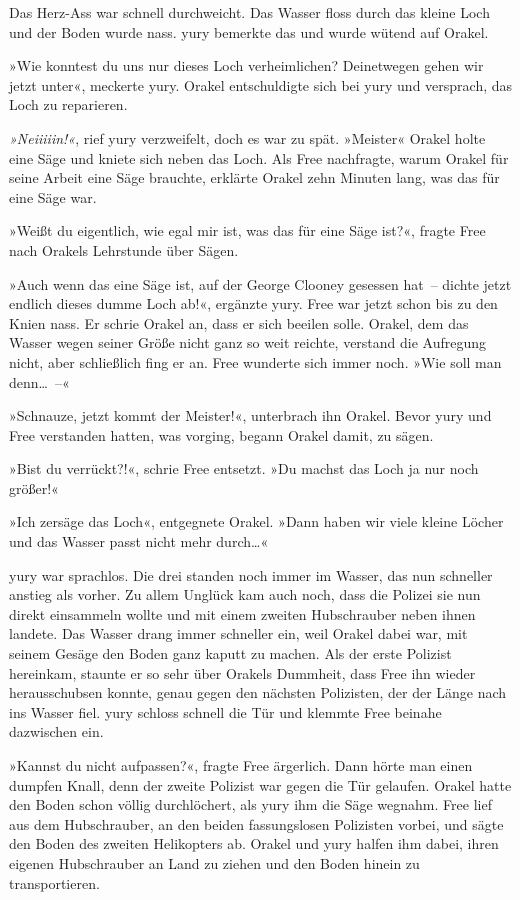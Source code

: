 Das Herz-Ass war schnell durchweicht. Das Wasser floss durch das kleine Loch und der Boden wurde nass. yury bemerkte das und wurde wütend auf Orakel.

»Wie konntest du uns nur dieses Loch verheimlichen? Deinetwegen gehen wir jetzt unter«, meckerte yury. Orakel entschuldigte sich bei yury und versprach, das Loch zu reparieren.

\emph{»Neiiiiin!«}, rief yury verzweifelt, doch es war zu spät. »Meister« Orakel holte eine Säge und kniete sich neben das Loch. Als Free nachfragte, warum Orakel für seine Arbeit eine Säge brauchte, erklärte Orakel zehn Minuten lang, was das für eine Säge war.

»Weißt du eigentlich, wie egal mir ist, was das für eine Säge ist?«, fragte Free nach Orakels Lehrstunde über Sägen.

»Auch wenn das eine Säge ist, auf der George Clooney gesessen hat~– dichte jetzt endlich dieses dumme Loch ab!«, ergänzte yury. Free war jetzt schon bis zu den Knien nass. Er schrie Orakel an, dass er sich beeilen solle. Orakel, dem das Wasser wegen seiner Größe nicht ganz so weit reichte, verstand die Aufregung nicht, aber schließlich fing er an. Free wunderte sich immer noch. »Wie soll man denn…~–«

»Schnauze, jetzt kommt der Meister!«, unterbrach ihn Orakel. Bevor yury und Free verstanden hatten, was vorging, begann Orakel damit, zu sägen.

»Bist du verrückt?!«, schrie Free entsetzt. »Du machst das Loch ja nur noch größer!«

»Ich zersäge das Loch«, entgegnete Orakel. »Dann haben wir viele kleine Löcher und das Wasser passt nicht mehr durch…«

yury war sprachlos. Die drei standen noch immer im Wasser, das nun schneller anstieg als vorher. Zu allem Unglück kam auch noch, dass die Polizei sie nun direkt einsammeln wollte und mit einem zweiten Hubschrauber neben ihnen landete. Das Wasser drang immer schneller ein, weil Orakel dabei war, mit seinem Gesäge den Boden ganz kaputt zu machen. Als der erste Polizist hereinkam, staunte er so sehr über Orakels Dummheit, dass Free ihn wieder herausschubsen konnte, genau gegen den nächsten Polizisten, der der Länge nach ins Wasser fiel. yury schloss schnell die Tür und klemmte Free beinahe dazwischen ein.

»Kannst du nicht aufpassen?«, fragte Free ärgerlich. Dann hörte man einen dumpfen Knall, denn der zweite Polizist war gegen die Tür gelaufen. Orakel hatte den Boden schon völlig durchlöchert, als yury ihm die Säge wegnahm. Free lief aus dem Hubschrauber, an den beiden fassungslosen Polizisten vorbei, und sägte den Boden des zweiten Helikopters ab. Orakel und yury halfen ihm dabei, ihren eigenen Hubschrauber an Land zu ziehen und den Boden hinein zu transportieren.

